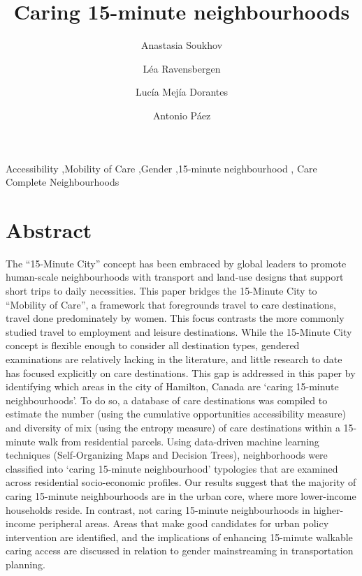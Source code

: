 \documentclass[
  authoryear,
  preprint,
  3p]{elsarticle}
\begin{document}
\begin{frontmatter}
\title{Caring 15-minute neighbourhoods}
\author[1]{Anastasia Soukhov%
%
}
\author[1]{Léa Ravensbergen%
%
}
\author[2]{Lucía Mejía Dorantes%
%
}
\author[1]{Antonio Páez%
%
}






        





\begin{keyword}
    Accessibility \sep Mobility of Care \sep Gender \sep 15-minute
neighbourhood \sep 
    Care Complete Neighbourhoods
\end{keyword}
\end{frontmatter}
    

\section{Abstract}\label{abstract}

The ``15-Minute City'' concept has been embraced by global leaders to
promote human-scale neighbourhoods with transport and land-use designs
that support short trips to daily necessities. This paper bridges the
15-Minute City to ``Mobility of Care'', a framework that foregrounds
travel to care destinations, travel done predominately by women. This
focus contrasts the more commonly studied travel to employment and
leisure destinations. While the 15-Minute City concept is flexible
enough to consider all destination types, gendered examinations are
relatively lacking in the literature, and little research to date has
focused explicitly on care destinations. This gap is addressed in this
paper by identifying which areas in the city of Hamilton, Canada are
`caring 15-minute neighbourhoods'. To do so, a database of care
destinations was compiled to estimate the number (using the cumulative
opportunities accessibility measure) and diversity of mix (using the
entropy measure) of care destinations within a 15-minute walk from
residential parcels. Using data-driven machine learning techniques
(Self-Organizing Maps and Decision Trees), neighborhoods were classified
into `caring 15-minute neighbourhood' typologies that are examined
across residential socio-economic profiles. Our results suggest that the
majority of caring 15-minute neighbourhoods are in the urban core, where
more lower-income households reside. In contrast, not caring 15-minute
neighbourhoods in higher-income peripheral areas. Areas that make good
candidates for urban policy intervention are identified, and the
implications of enhancing 15-minute walkable caring access are discussed
in relation to gender mainstreaming in transportation planning.
\end{document}
